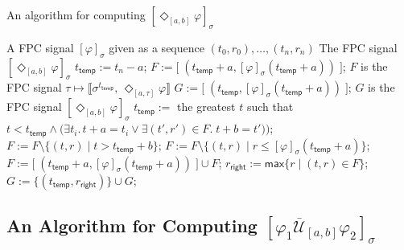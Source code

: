\documentclass[envcountsect,orivec]{llncs} \usepackage{etex} \usepackage[]{graphicx}
\newcommand{\TUntil}[1]{\mathbin{\overline{\mathcal{U}}_{#1}}}
\newcommand{\DiaOp}[1]{\Diamond_{#1}}
\newcommand{\Robust}[2]{{ \llbracket #1,\, #2 \rrbracket}}
\newcommand{\Max}{\mathsf{max}}
\begin{document}
\begin{algorithm}
  \caption{An algorithm for computing $[\DiaOp{[a,b]} \varphi]_{\sigma}$}
  \label{algo:dia}
    \begin{algorithmic}
      \Require A FPC signal $[\varphi]_{\sigma}$ given as a sequence 
      $(t_{0},r_{0}),\dotsc,(t_{n},r_{n})$ 
      \Ensure The FPC signal $[\DiaOp{[a,b]} \varphi]_{\sigma}$
      \State $t_{\mathsf{temp}} := t_n - a$; 
      \State $F := \bigl[ \;(t_{\mathsf{temp}}+a, [\varphi]_{\sigma}(t_{\mathsf{temp}} + a)) \;\bigr]$; 
      \Comment $F$ is the FPC signal 
      $\tau \mapsto \Robust{\sigma^{t_{\mathsf{temp}}}}{\DiaOp{[a,\tau]}\varphi}$
\State 
      $G := \bigl[ \;(t_{\mathsf{temp}}, [\varphi]_{\sigma}(t_{\mathsf{temp}} + a)) \;\bigr]$; 
      \Comment $G$ is the FPC signal $[\DiaOp{[a,b]} \varphi]_{\sigma}$
      \State $t_{\mathsf{temp}} :=$ the greatest $t$ such that 
      $t < t_{\mathsf{temp}} \wedge \bigl(\exists t_i.\, t + a = t_i \vee \exists (t', r') \in F. \; t+ b = t') \bigr)$;
      \State $F := F \setminus \{(t, r) \mid t > t_{\mathsf{temp}} + b\}$; 
      \State $F := F \setminus \{(t, r) \mid r \leq [\varphi]_{\sigma}(t_{\mathsf{temp}} + a) \}$; 
      \State $F := \big[ \;(t_{\mathsf{temp}}+a, [\varphi]_{\sigma}(t_{\mathsf{temp}} + a) )\;\big] \cup F$;
      \State $r_{\mathsf{right}} := \Max \{ r \mid (t,r)\in F \}$;
      \State $G := \{(t_{\mathsf{temp}}, r_{\mathsf{right}})\} \cup G$;
      \EndWhile
    \end{algorithmic}
\end{algorithm}

\subsection{An Algorithm for Computing $[\varphi_1 \TUntil{[a,b]} \varphi_2]_{\sigma}$ }
\label{appendix:algoTUntil}
\end{document}
